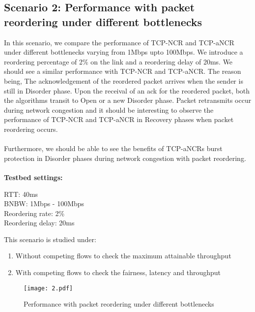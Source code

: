\subsection{Scenario 2: Performance with packet reordering under different bottlenecks\label{ss:is2}}
In this scenario, we compare the performance of TCP-NCR and TCP-aNCR under different bottlenecks varying from 1Mbps upto 100Mbps. We introduce a reordering percentage of 2\% on the link and a reordering delay of 20ms.
We should see a similar performance with TCP-NCR and TCP-aNCR. The reason being, The acknowledgement of the reordered packet arrives when the sender is still in Disorder phase. Upon the receival of an ack for the reordered packet,
both the algorithms transit to Open or a new Disorder phase. Packet retransmits occur during network congestion and it should be interesting to observe the performance of TCP-NCR and TCP-aNCR in Recovery phases when packet reordering occurs.
\\
\\
Furthermore, we should be able to see the benefits of TCP-aNCRs burst protection in Disorder phases during network congestion with packet reordering.
\\
\\
\textbf{Testbed settings:}
\begin{tabbing}
\enspace RTT: 40ms \\
\enspace BNBW: 1Mbps - 100Mbps \\
\enspace Reordering rate: 2\% \\
\enspace Reordering delay: 20ms
\end{tabbing}
This scenario is studied under:
\begin{enumerate}
    \item Without competing flows to check the maximum attainable throughput
    \item With competing flows to check the fairness, latency and throughput
\end{enumerate}

\begin{figure}
    \centering
    \texttt{[image: 2.pdf]}\\
    \caption{Performance with packet reordering under different bottlenecks}\label{fig:2_i}
\end{figure}

\
